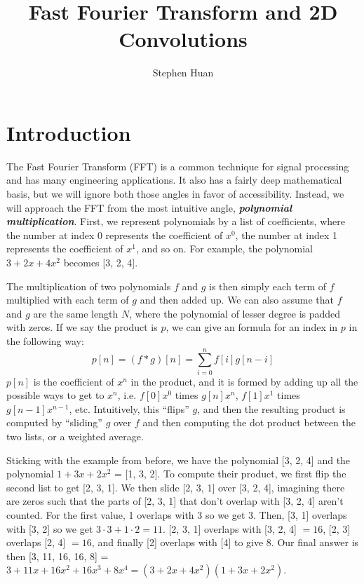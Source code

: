 \documentclass[11pt, oneside]{article}
\title{Fast Fourier Transform and 2D Convolutions}
\author{Stephen Huan}
\newcommand{\emphasis}[1]{\textbf{\textit{#1}}}
\theoremstyle{plain}
\theoremstyle{definition}
\begin{document}
\maketitle

\section{Introduction}

The Fast Fourier Transform (FFT) is a common technique for signal processing
and has many engineering applications. It also has a fairly deep mathematical
basis, but we will ignore both those angles in favor of accessibility.
Instead, we will approach the FFT from the most intuitive angle,
\emphasis{polynomial multiplication}.
First, we represent polynomials by a list of coefficients,
where the number at index 0 represents the coefficient of \( x^0 \),
the number at index 1 represents the coefficient of \( x^1 \), and so on.
For example, the polynomial \( 3 + 2x + 4x^2 \) becomes [3, 2, 4].

The multiplication of two polynomials \( f \) and \( g \) is then simply
each term of \( f \) multiplied with each term of \( g \) and then added up.
We can also assume that \( f \) and \( g \) are the same length \( N \),
where the polynomial of lesser degree is padded with zeros.
If we say the product is \( p \), we can give an formula
for an index in \( p \) in the following way:
\[ p[n] = (f * g)[n] = \sum^n_{i = 0} f[i]g[n - i] \]
\( p[n] \) is the coefficient of \( x^n \) in the product, and it is formed
by adding up all the possible ways to get to \( x^n \), i.e. \( f[0] x^0 \)
times \( g[n] x^n \), \( f[1] x^1 \) times \( g[n - 1] x^{n - 1} \), etc.
Intuitively, this \enquote{flips} \( g \), and then the resulting product
is computed by \enquote{sliding} \( g \) over \( f \) and then computing
the dot product between the two lists, or a weighted average.

Sticking with the example from before, we have the polynomial [3, 2, 4]
and the polynomial \( 1 + 3x + 2x^2 \) = [1, 3, 2]. To compute their
product, we first flip the second list to get [2, 3, 1]. We then slide [2, 3, 1]
over [3, 2, 4], imagining there are zeros such that the parts of [2, 3, 1]
that don't overlap with [3, 2, 4] aren't counted.
For the first value, 1 overlaps with 3 so we get 3. 
Then, [3, 1] overlaps with [3, 2] so we get \( 3 \cdot 3 + 1 \cdot 2 = 11 \).
[2, 3, 1] overlaps with [3, 2, 4] \( = 16 \), [2, 3] overlaps [2, 4] \( = 16 \),
and finally [2] overlaps with [4] to give 8.
Our final answer is then [3, 11, 16, 16, 8] = \( 3 + 11x + 16x^2 + 16x^3 + 8x^4
= (3 + 2x + 4x^2)(1 + 3x + 2x^2) \).
\end{document}
